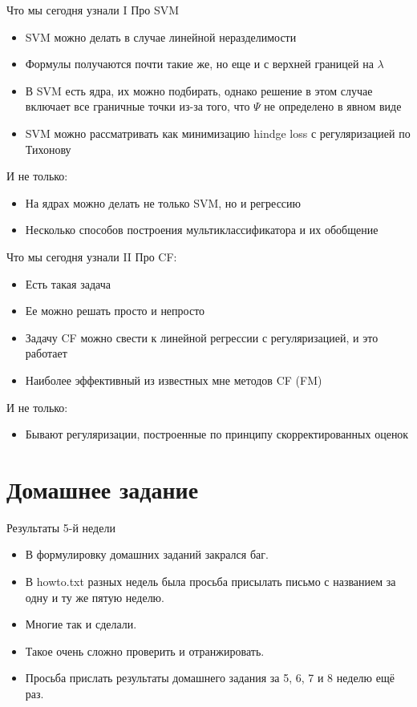 \documentclass[14pt, fleqn, xcolor={dvipsnames, table}]{beamer}
\begin{document}
\begin{frame}{Что мы сегодня узнали I}
\small
Про SVM
\begin{itemize}
  \item SVM можно делать в случае линейной неразделимости
  \item Формулы получаются почти такие же, но еще и с верхней границей на $\lambda$
  \item В SVM есть ядра, их можно подбирать, однако решение в этом случае включает все граничные точки из-за того, что $\Psi$ не определено в явном виде
  \item SVM можно рассматривать как минимизацию hindge loss с регуляризацией по Тихонову
\end{itemize}
И не только:
\begin{itemize}
  \item На ядрах можно делать не только SVM, но и регрессию
  \item Несколько способов построения мультиклассификатора и их обобщение
\end{itemize}
\end{frame}

\begin{frame}{Что мы сегодня узнали II}
\small
Про CF:
\begin{itemize}
  \item Есть такая задача
  \item Ее можно решать просто и непросто
  \item Задачу CF можно свести к линейной регрессии с регуляризацией, и это работает
  \item Наиболее эффективный из известных мне методов CF (FM)
\end{itemize}
И не только:
\begin{itemize}
  \item Бывают регуляризации, построенные по принципу скорректированных оценок
\end{itemize}
\end{frame}

\section{Домашнее задание}
\begin{frame}{Результаты 5-й недели}
\begin{itemize}
  \item В формулировку домашних заданий закрался баг.
  \item В howto.txt разных недель была просьба присылать письмо с названием за одну и ту же пятую неделю.
  \item Многие так и сделали.
  \item Такое очень сложно проверить и отранжировать.
  \item Просьба прислать результаты домашнего задания за 5, 6, 7 и 8 неделю ещё раз. 
\end{itemize}
\end{frame}
\end{document}
